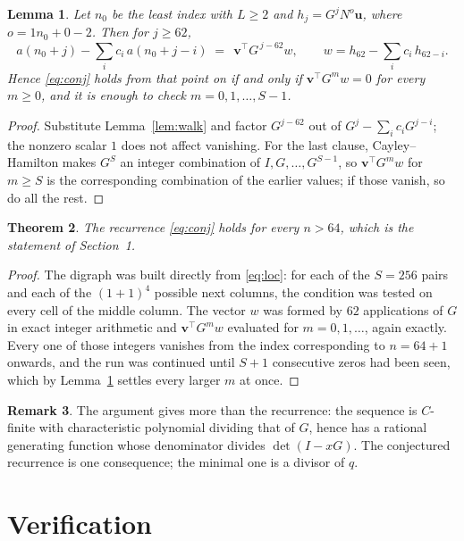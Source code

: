 \documentclass[11pt,a4paper]{article}
\theoremstyle{plain}
\newtheorem{theorem}{Theorem}
\newtheorem{lemma}[theorem]{Lemma}
\theoremstyle{definition}
\newtheorem{remark}[theorem]{Remark}
\begin{document}
\begin{lemma}\label{lem:crit}
Let $n_0$ be the least index with $L\ge2$ and $h_j=G^{j}N^{o}\mathbf{u}$, where
$o=1n_0+0-2$. Then for $j\ge62$,
\[
a(n_0+j)-\sum_i c_i\,a(n_0+j-i)\;=\;\,\mathbf{v}^{\!\top}G^{\,j-62}w,
\qquad w=h_{62}-\sum_i c_i\,h_{62-i} .
\]
Hence \eqref{eq:conj} holds from that point on if and only if
$\mathbf{v}^{\!\top}G^{m}w=0$ for every $m\ge0$, and it is enough to check
$m=0,1,\dots,S-1$.
\end{lemma}

\begin{proof}
Substitute Lemma~\ref{lem:walk} and factor $G^{j-62}$ out of
$G^{j}-\sum_ic_iG^{j-i}$; the nonzero scalar $1$ does not affect
vanishing. For the last clause, Cayley--Hamilton makes $G^{S}$ an integer combination of
$I,G,\dots,G^{S-1}$, so $\mathbf{v}^{\!\top}G^{m}w$ for $m\ge S$ is the corresponding
combination of the earlier values; if those vanish, so do all the rest.
\end{proof}

\begin{theorem}
The recurrence \eqref{eq:conj} holds for every $n>64$, which is the statement of
Section~1.
\end{theorem}

\begin{proof}
The digraph was built directly from \eqref{eq:loc}: for each of the $S=256$ pairs and each
of the $(1+1)^{4}$ possible next columns, the condition was tested on every cell of
the middle column. The vector $w$ was formed by $62$ applications of $G$ in exact integer
arithmetic and $\mathbf{v}^{\!\top}G^{m}w$ evaluated for $m=0,1,\dots$, again exactly.
Every one of those integers vanishes from the index corresponding to $n=64+1$ onwards,
and the run was continued until $S+1$ consecutive zeros had been seen, which by
Lemma~\ref{lem:crit} settles every larger $m$ at once.
\end{proof}

\begin{remark}
The argument gives more than the recurrence: the sequence is $C$-finite with characteristic
polynomial dividing that of $G$, hence has a rational generating function whose denominator
divides $\det(I-xG)$. The conjectured recurrence is one consequence; the minimal one is a
divisor of $q$.
\end{remark}

\section{Verification}
\end{document}
